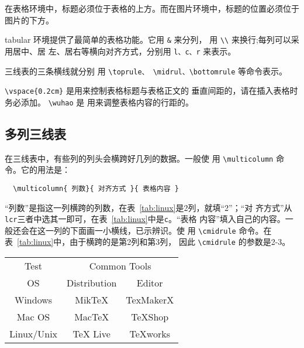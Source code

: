 在表格环境中，标题必须位于表格的上方。而在图片环境中，标题的位置必须位于
图片的下方。

tabular 环境提供了最简单的表格功能。它用 \texttt{\&} 来分列，
用 \texttt{\textbackslash{\textbackslash{}}} 来换行;每列可以采用居中、居
左、居右等横向对齐方式，分别用 \texttt{l、c、r} 来表示。

三线表的三条横线就分别
用 \verb|\toprule、 \midrul、\bottomrule| 等命令表示。

\verb|\vspace{0.2cm}| 是用来控制表格标题与表格正文的
垂直间距的，请在插入表格时务必添加。 \verb|\wuhao| 是
用来调整表格内容的行距的。


\subsection{多列三线表}

在三线表中，有些列的列头会横跨好几列的数据。一般使
用 \verb|\multicolumn| 命令。它的用法是：
\begin{lstlisting}
  \multicolumn{ 列数}{ 对齐方式 }{ 表格内容 }
\end{lstlisting}

“列数”是指这一列横跨的列数，在表~\ref{tab:linux}是2列，就填“2”；“对
齐方式”从\texttt{lcr}三者中选其一即可，在表~\ref{tab:linux}中是\texttt{c}。“表格
内容”填入自己的内容。一般还会在这一列的下面画一小横线，已示辨识。使
用 \verb|\cmidrule| 命令。在表~\ref{tab:linux}中，由于横跨的是第2列和第3列，
因此 \verb|\cmidrule| 的参数是2-3。

\begin{table}[htbp]
  \centering
  \vspace{0.2cm}
  \wuhao
  \begin{tabular}{ccc}
    \toprule
    Test    & \multicolumn{2}{c}{Common Tools} \\
              \cmidrule{2-3}
    OS         & Distribution & Editor  \\
    \midrule
    Windows    & MikTeX       & TexMakerX  \\
    Mac OS     & MacTeX       & TeXShop  \\
    Linux/Unix & TeX Live     & TeXworks  \\
    \bottomrule
  \end{tabular}
\end{table}


